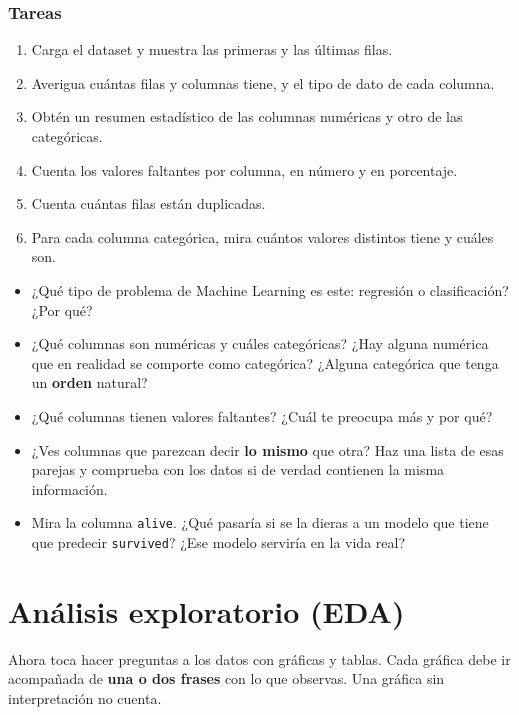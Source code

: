 \documentclass[11pt,a4paper]{article}
\newcommand{\col}[1]{\texttt{#1}}
\begin{document}
\subsubsection*{Tareas}
\begin{enumerate}
  \item Carga el dataset y muestra las primeras y las últimas filas.
  \item Averigua cuántas filas y columnas tiene, y el tipo de dato de cada columna.
  \item Obtén un resumen estadístico de las columnas numéricas y otro de las categóricas.
  \item Cuenta los valores faltantes por columna, en número y en porcentaje.
  \item Cuenta cuántas filas están duplicadas.
  \item Para cada columna categórica, mira cuántos valores distintos tiene y cuáles son.
\end{enumerate}

\begin{preguntas}
\begin{itemize}
  \item ¿Qué tipo de problema de Machine Learning es este: regresión o clasificación? ¿Por qué?
  \item ¿Qué columnas son numéricas y cuáles categóricas? ¿Hay alguna numérica que en
        realidad se comporte como categórica? ¿Alguna categórica que tenga un
        \textbf{orden} natural?
  \item ¿Qué columnas tienen valores faltantes? ¿Cuál te preocupa más y por qué?
  \item ¿Ves columnas que parezcan decir \textbf{lo mismo} que otra? Haz una lista de esas
        parejas y comprueba con los datos si de verdad contienen la misma información.
  \item Mira la columna \col{alive}. ¿Qué pasaría si se la dieras a un modelo que tiene
        que predecir \col{survived}? ¿Ese modelo serviría en la vida real?
\end{itemize}
\end{preguntas}

\section{Análisis exploratorio (EDA)}

Ahora toca hacer preguntas a los datos con gráficas y tablas. Cada gráfica debe ir
acompañada de \textbf{una o dos frases} con lo que observas. Una gráfica sin
interpretación no cuenta.
\end{document}
